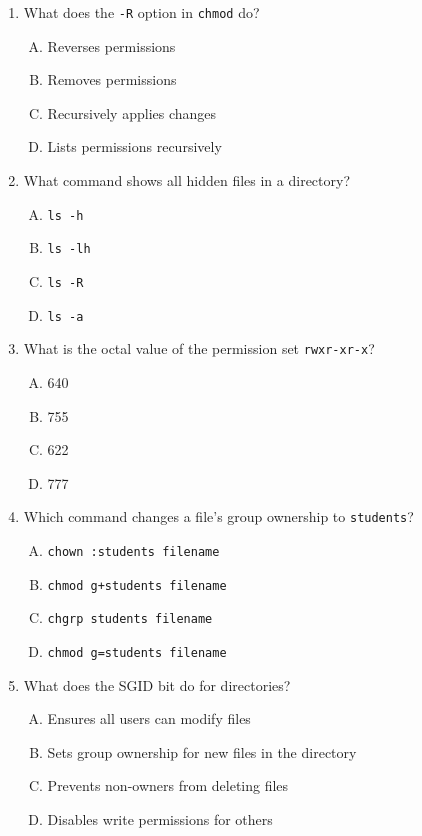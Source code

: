 \documentclass[a4paper]{report}
\begin{document}
\begin{enumerate}[1.]
    \item What does the \texttt{-R} option in \texttt{chmod} do?  
    \begin{enumerate}[A)]
        \item Reverses permissions  
        \item Removes permissions  
        \item Recursively applies changes  
        \item Lists permissions recursively  
    \end{enumerate}

    \item What command shows all hidden files in a directory?  
    \begin{enumerate}[A)]
        \item \texttt{ls -h}  
        \item \texttt{ls -lh}  
        \item \texttt{ls -R}  
        \item \texttt{ls -a}  
    \end{enumerate}

    \item What is the octal value of the permission set \texttt{rwxr-xr-x}?  
    \begin{enumerate}[A)]
        \item 640  
        \item 755  
        \item 622  
        \item 777  
    \end{enumerate}

    \item Which command changes a file's group ownership to \texttt{students}?  
    \begin{enumerate}[A)]
        \item \texttt{chown :students filename}  
        \item \texttt{chmod g+students filename}  
        \item \texttt{chgrp students filename}  
        \item \texttt{chmod g=students filename}  
    \end{enumerate}

    \item What does the SGID bit do for directories?  
    \begin{enumerate}[A)]
        \item Ensures all users can modify files  
        \item Sets group ownership for new files in the directory  
        \item Prevents non-owners from deleting files  
        \item Disables write permissions for others  
    \end{enumerate}


\end{enumerate}
\end{document}
